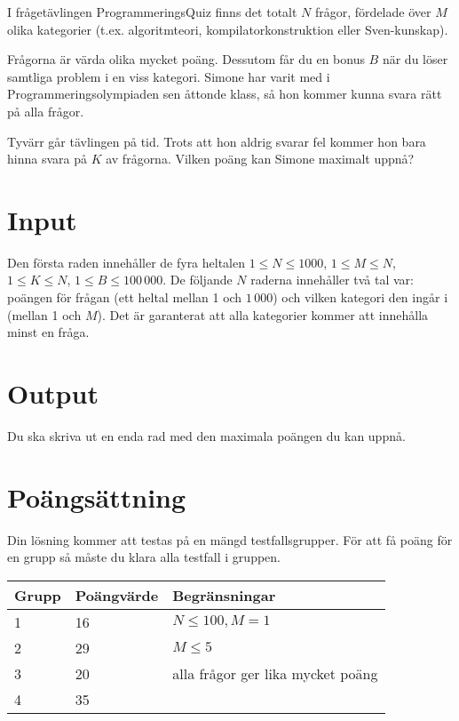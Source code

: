 I frågetävlingen ProgrammeringsQuiz finns det totalt $N$ frågor, fördelade över $M$ olika kategorier (t.ex. algoritmteori,
kompilatorkonstruktion eller Sven-kunskap).

Frågorna är värda olika mycket poäng. Dessutom får du en bonus $B$ när du löser samtliga problem i en viss kategori.
Simone har varit med i Programmeringsolympiaden sen åttonde klass, så hon kommer kunna svara rätt på alla frågor.

Tyvärr går tävlingen på tid. Trots att hon aldrig svarar fel kommer hon bara hinna svara på $K$ av frågorna.
Vilken poäng kan Simone maximalt uppnå?

\section*{Input}
Den första raden innehåller de fyra heltalen $1 \le N \le 1000$, $1 \le M \le N$, $1 \le K \le N$, $1 \le B \le 100\,000$.
De följande $N$ raderna innehåller två tal var: poängen för frågan (ett heltal mellan 1 och $1\,000$) och vilken kategori den ingår i (mellan 1 och $M$).
Det är garanterat att alla kategorier kommer att innehålla minst en fråga.

\section*{Output}
Du ska skriva ut en enda rad med den maximala poängen du kan uppnå.

\section*{Poängsättning}
Din lösning kommer att testas på en mängd testfallsgrupper. För att få poäng för en grupp så måste du klara alla testfall i gruppen.

\begin{tabular}{| l | l | l |}
  \hline
  Grupp & Poängvärde & Begränsningar\\ \hline
  1     & 16         & $N \le 100, M = 1$ \\ \hline
  2     & 29         & $M \le 5$ \\ \hline
  3     & 20         & alla frågor ger lika mycket poäng \\ \hline
  4     & 35         & \\ \hline
\end{tabular}
